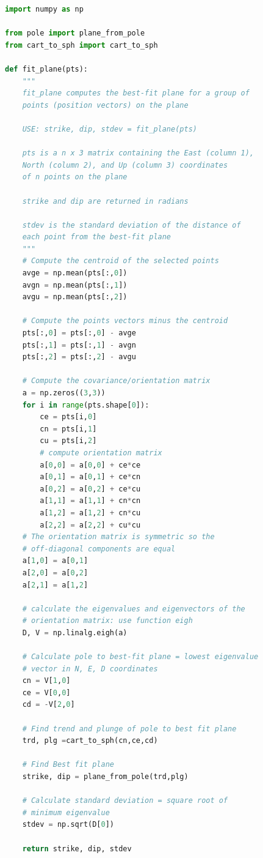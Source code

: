 \documentclass[a4paper , 12pt]{book}
\begin{document}
\begin{center}
\begin{lstlisting}[language=Python, frame=single]
import numpy as np

from pole import plane_from_pole
from cart_to_sph import cart_to_sph

def fit_plane(pts):
	"""
	fit_plane computes the best-fit plane for a group of
	points (position vectors) on the plane
	
	USE: strike, dip, stdev = fit_plane(pts)
	
	pts is a n x 3 matrix containing the East (column 1),
	North (column 2), and Up (column 3) coordinates
	of n points on the plane
	
	strike and dip are returned in radians
	
	stdev is the standard deviation of the distance of
	each point from the best-fit plane
	"""
	# Compute the centroid of the selected points
	avge = np.mean(pts[:,0])
	avgn = np.mean(pts[:,1])
	avgu = np.mean(pts[:,2])
	
	# Compute the points vectors minus the centroid
	pts[:,0] = pts[:,0] - avge
	pts[:,1] = pts[:,1] - avgn
	pts[:,2] = pts[:,2] - avgu
	
	# Compute the covariance/orientation matrix
	a = np.zeros((3,3))
	for i in range(pts.shape[0]):
		ce = pts[i,0]
		cn = pts[i,1]
		cu = pts[i,2]
		# compute orientation matrix
		a[0,0] = a[0,0] + ce*ce
		a[0,1] = a[0,1] + ce*cn
		a[0,2] = a[0,2] + ce*cu
		a[1,1] = a[1,1] + cn*cn
		a[1,2] = a[1,2] + cn*cu
		a[2,2] = a[2,2] + cu*cu
	# The orientation matrix is symmetric so the 
	# off-diagonal components are equal
	a[1,0] = a[0,1]
	a[2,0] = a[0,2]
	a[2,1] = a[1,2]
	
	# calculate the eigenvalues and eigenvectors of the
	# orientation matrix: use function eigh
	D, V = np.linalg.eigh(a)
	
	# Calculate pole to best-fit plane = lowest eigenvalue
	# vector in N, E, D coordinates
	cn = V[1,0]
	ce = V[0,0]
	cd = -V[2,0]
	
	# Find trend and plunge of pole to best fit plane
	trd, plg =cart_to_sph(cn,ce,cd)
	
	# Find Best fit plane
	strike, dip = plane_from_pole(trd,plg)
	
	# Calculate standard deviation = square root of
	# minimum eigenvalue
	stdev = np.sqrt(D[0])
	
	return strike, dip, stdev
\end{lstlisting}
\end{center}
\end{document}
